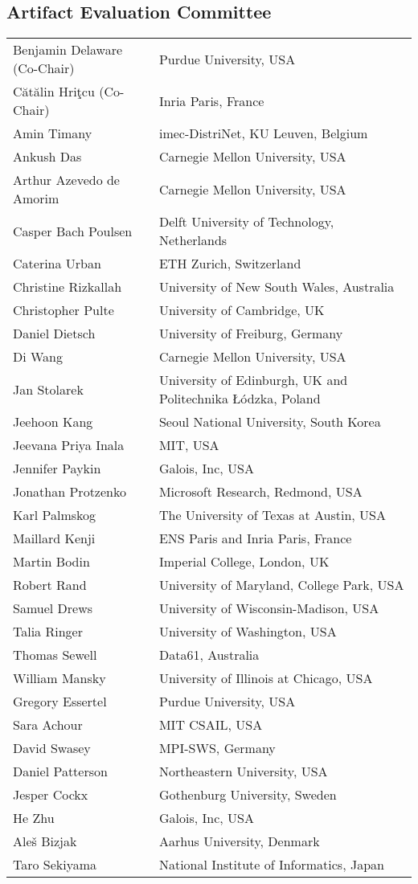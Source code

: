 \subsection*{\sffamily Artifact Evaluation Committee}

\begin{tabular}{@{}p{\namewidth}l@{}}
Benjamin Delaware (Co-Chair)
  & Purdue University, USA\\
C\u{a}t\u{a}lin Hri\c{t}cu (Co-Chair)
  & Inria Paris, France \\
Amin Timany
  & imec-DistriNet, KU Leuven, Belgium\\
Ankush Das
  & Carnegie Mellon University, USA\\
Arthur Azevedo de Amorim
  & Carnegie Mellon University, USA\\
Casper Bach Poulsen
  & Delft University of Technology, Netherlands\\
Caterina Urban
  & ETH Zurich, Switzerland\\
Christine Rizkallah
  & University of New South Wales, Australia\\
Christopher Pulte
  & University of Cambridge, UK\\
Daniel Dietsch
  & University of Freiburg, Germany\\
Di Wang
  & Carnegie Mellon University, USA\\
Jan Stolarek
  & University of Edinburgh, UK and Politechnika Łódzka, Poland\\
Jeehoon Kang
  & Seoul National University, South Korea\\
Jeevana Priya Inala
  & MIT, USA\\
Jennifer Paykin
  & Galois, Inc, USA\\
Jonathan Protzenko
  & Microsoft Research, Redmond, USA\\
Karl Palmskog
  & The University of Texas at Austin, USA\\
Maillard Kenji
  & ENS Paris and Inria Paris, France\\
Martin Bodin
  & Imperial College, London, UK\\
Robert Rand
  & University of Maryland, College Park, USA\\
Samuel Drews
  & University of Wisconsin-Madison, USA\\
Talia Ringer
  & University of Washington, USA\\
Thomas Sewell
  & Data61, Australia\\
William Mansky
  & University of Illinois at Chicago, USA\\
Gregory Essertel
  & Purdue University, USA\\
Sara Achour
  & MIT CSAIL, USA\\
David Swasey
  & MPI-SWS, Germany\\
Daniel Patterson
  & Northeastern University, USA\\
Jesper Cockx
  & Gothenburg University, Sweden\\
He Zhu
  & Galois, Inc, USA\\
Aleš Bizjak
  & Aarhus University, Denmark\\
Taro Sekiyama
  & National Institute of Informatics, Japan
\end{tabular}


\newpage
